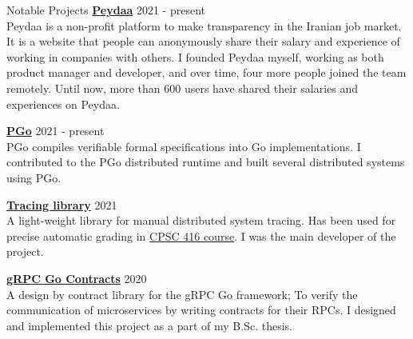 \documentclass{resume} %
\begin{document}
\begin{rSection}{Notable Projects}
	{\bf \href{https://peydaa.ir/}{Peydaa}} \hfill 2021 - present
	\\ Peydaa is a non-profit platform to make transparency in the Iranian job market. 
    It is a website that people can anonymously share their salary and experience of working 
    in companies with others. I founded Peydaa myself, working as both product manager and 
    developer, and over time, four more people joined the team remotely. Until now, more 
    than 600 users have shared their salaries and experiences on Peydaa.

	{\bf \href{https://github.com/UBC-NSS/pgo}{PGo}} \hfill 2021 - present
	\\PGo compiles verifiable formal specifications into Go implementations. I contributed 
    to the PGo distributed runtime and built several distributed systems using PGo. 

	{\bf \href{https://github.com/DistributedClocks/tracing}{Tracing library}} \hfill 2021
	\\A light-weight library for manual distributed system tracing. Has been used for 
    precise automatic grading in 
    \href{https://www.cs.ubc.ca/~bestchai/teaching/cs416_2020w2/index.html}{CPSC 416 course}. 
    I was the main developer of the project.

    {\bf \href{https://github.com/shayanh/grpc-go-contracts}{gRPC Go Contracts}} \hfill 2020
    \\A design by contract library for the gRPC Go framework; To verify the communication of 
    microservices by writing contracts for their RPCs. I designed and implemented this project 
    as a part of my B.Sc. thesis.


\end{rSection}
\end{document}
